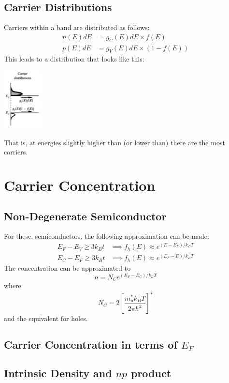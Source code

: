 \documentclass[nobib]{tufte-handout}
\begin{document}
\subsection{Carrier Distributions}
Carriers within a band are distributed as follows:
\begin{align*}
    n(E)dE &=g_C(E)dE \times f(E)\\
    p(E)dE &=g_V(E)dE \times (1-f(E))
\end{align*}
This leads to a distribution that looks like this:
\begin{center}
    \includegraphics[height = 120px]{images/carrier_distribution.png}
\end{center}
That is, at energies slightly higher than (or lower than) there are the most carriers.
\section{Carrier Concentration}
\subsection{Non-Degenerate Semiconductor}
For these, semiconductors, the following approximation can be made:
\begin{align*}
    E_F-E_V\geq 3k_B t &\implies f_h(E) \approx e^{(E-E_F)/k_B T}\\
    E_C-E_F\geq 3k_B t &\implies f_h(E) \approx e^{(E_F-E)/k_B T}
\end{align*}
The concentration can be approximated to \begin{equation*}
    n = N_C e^{(E_F-E_C)/k_B T}
\end{equation*} where \begin{equation*}
    N_C = 2 \left[\frac{m_n^* k_B T}{2 \pi \hbar^2}\right]^{\frac{3}{2}}
\end{equation*}
and the equivalent for holes.
\subsection*{Carrier Concentration in terms of $E_F$}
\subsection*{Intrinsic Density and $np$ product}
\end{document}
